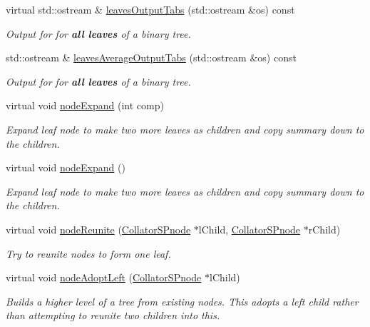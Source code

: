 \begin{DoxyCompactItemize}
virtual std\-::ostream \& \hyperlink{classsubpavings_1_1CollatorSPnode_ad54a1befc9cff87c02237caeabe84ea5}{leaves\-Output\-Tabs} (std\-::ostream \&os) const 
\begin{DoxyCompactList}\small\item\em \-Output for for {\bfseries all leaves} of a binary tree. \end{DoxyCompactList}\item 
std\-::ostream \& \hyperlink{classsubpavings_1_1CollatorSPnode_a0f37c9801d51df76b2acf7ea4c45e122}{leaves\-Average\-Output\-Tabs} (std\-::ostream \&os) const 
\begin{DoxyCompactList}\small\item\em \-Output for for {\bfseries all leaves} of a binary tree. \end{DoxyCompactList}\item 
virtual void \hyperlink{classsubpavings_1_1CollatorSPnode_af0789230e2a9612f9b0644113e318f37}{node\-Expand} (int comp)
\begin{DoxyCompactList}\small\item\em \-Expand leaf node to make two more leaves as children and copy summary down to the children. \end{DoxyCompactList}\item 
virtual void \hyperlink{classsubpavings_1_1CollatorSPnode_ad54fcce3c5c904f7ecf0f5042515e1a5}{node\-Expand} ()
\begin{DoxyCompactList}\small\item\em \-Expand leaf node to make two more leaves as children and copy summary down to the children. \end{DoxyCompactList}\item 
virtual void \hyperlink{classsubpavings_1_1CollatorSPnode_ace8192ce1536f578c73c7aa12bb49e35}{node\-Reunite} (\hyperlink{classsubpavings_1_1CollatorSPnode}{\-Collator\-S\-Pnode} $\ast$l\-Child, \hyperlink{classsubpavings_1_1CollatorSPnode}{\-Collator\-S\-Pnode} $\ast$r\-Child)
\begin{DoxyCompactList}\small\item\em \-Try to reunite nodes to form one leaf. \end{DoxyCompactList}\item 
virtual void \hyperlink{classsubpavings_1_1CollatorSPnode_aca275f3faaa0170c0612f368bae4acdf}{node\-Adopt\-Left} (\hyperlink{classsubpavings_1_1CollatorSPnode}{\-Collator\-S\-Pnode} $\ast$l\-Child)
\begin{DoxyCompactList}\small\item\em \-Builds a higher level of a tree from existing nodes. \-This adopts a left child rather than attempting to reunite two children into this. \end{DoxyCompactList}\item 

\end{DoxyCompactItemize}
